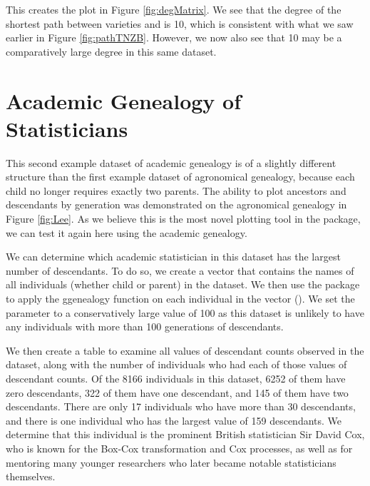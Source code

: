 \documentclass[article,shortnames]{jss}
\begin{document}
This creates the plot in Figure \ref{fig:degMatrix}. We see that the degree of the shortest path between varieties  and  is 10, which is consistent with what we saw earlier in Figure \ref{fig:pathTNZB}. However, we now also see that 10 may be a comparatively large degree in this same dataset.

\section{Academic Genealogy of Statisticians}




This second example dataset of academic genealogy is of a slightly different structure than the first example dataset of agronomical genealogy, because each child no longer requires exactly two parents. The ability to plot ancestors and descendants by generation was demonstrated on the agronomical genealogy in Figure \ref{fig:Lee}. As we believe this is the most novel plotting tool in the  package, we can test it again here using the academic genealogy.

We can determine which academic statistician in this  dataset has the largest number of descendants. To do so, we create a vector  that contains the names of all individuals (whether child or parent) in the dataset. We then use the  package to apply the ggenealogy function  on each individual in the  vector (\citealt{dplyr}). We set the parameter  to a conservatively large value of 100 as this dataset is unlikely to have any individuals with more than 100 generations of descendants.

We then create a table to examine all values of descendant counts observed in the dataset, along with the number of individuals who had each of those values of descendant counts. Of the 8166 individuals in this dataset, 6252 of them have zero descendants, 322 of them have one descendant, and 145 of them have two descendants. There are only 17 individuals who have more than 30 descendants, and there is one individual who has the largest value of 159 descendants. We determine that this individual is the prominent British statistician Sir David Cox, who is known for the Box-Cox transformation and Cox processes, as well as for mentoring many younger researchers who later became notable statisticians themselves.
\end{document}
